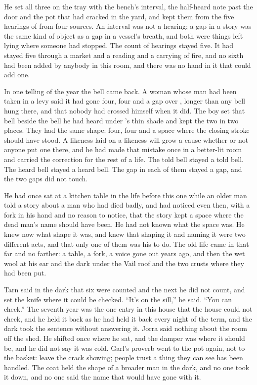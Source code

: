 He set all three on the tray with the bench's interval, the half-heard note past the door and the pot that had cracked in the yard, and kept them from the five hearings of  from four sources. An interval was not a hearing; a gap in a story was the same kind of object as a gap in a vessel's breath, and both were things left lying where someone had stopped. The count of hearings stayed five. It had stayed five through a market and a reading and a carrying of fire, and no sixth had been added by anybody in this room, and there was no hand in it that could add one.

In one telling of the year the bell came back. A woman whose man had been taken in a levy said it had gone four, four and a gap over , longer than any bell hung there, and that nobody had crossed himself when it did. The boy set that bell beside the bell he had heard under 's thin shade and kept the two in two places. They had the same shape: four, four and a space where the closing stroke should have stood. A likeness laid on a likeness will grow a cause whether or not anyone put one there, and he had made that mistake once in a better-lit room and carried the correction for the rest of a life. The told bell stayed a told bell. The heard bell stayed a heard bell. The gap in each of them stayed a gap, and the two gaps did not touch.

He had once sat at a kitchen table in the life before this one while an older man told a story about a man who had died badly, and had noticed even then, with a fork in his hand and no reason to notice, that the story kept a space where the dead man's name should have been. He had not known what the space was. He knew now what shape it was, and knew that shaping it and naming it were two different acts, and that only one of them was his to do. The old life came in that far and no farther: a table, a fork, a voice gone out years ago, and then the wet wool at his ear and the dark under the Vail roof and the two crusts where they had been put.

Tarn said in the dark that six were counted and the next he did not count, and set the knife where it could be checked. “It's on the sill,” he said. “You can check.” The seventh year was the one entry in this house that the house could not check, and he held it back as he had held it back every night of the term, and the dark took the sentence without answering it. Jorra said nothing about the room off the shed. He shifted once where he sat, and the damper was where it should be, and he did not say it was cold. Garl's proverb went to the pot again, not to the basket: leave the crack showing; people trust a thing they can see has been handled. The coat held the shape of a broader man in the dark, and no one took it down, and no one said the name that would have gone with it.

